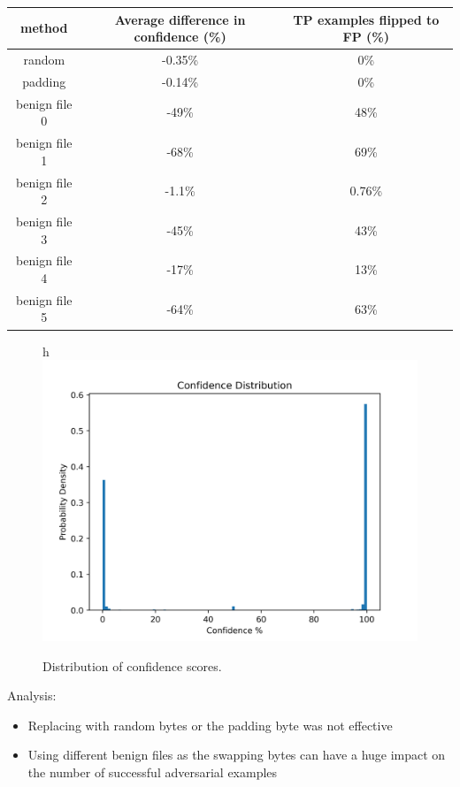 \documentclass{article}
\begin{document}
\begin{center}
	\begin{tabular}{| c | c | c |}
		\hline
		method & Average difference in confidence (\%) & TP examples flipped to FP (\%) \\
		\hline 
		random & -0.35\% & 0\% \\  
		padding & -0.14\% & 0\% \\
		benign file 0 & -49\% & 48\% \\   
		benign file 1 & -68\% & 69\% \\   
		benign file 2 & -1.1\% & 0.76\% \\ 
		benign file 3 & -45\% & 43\% \\ 
		benign file 4 & -17\% & 13\% \\
		benign file 5 & -64\% & 63\% \\
		\hline
	\end{tabular}
\end{center}

\begin{figure}{h}
	\centering
	\includegraphics[scale=.5]{./figures/confidence_distribution.png}
	\caption{Distribution of confidence scores.}
\end{figure}

Analysis:
\begin{itemize}
	\item Replacing with random bytes or the padding byte was not effective
	\item Using different benign files as the swapping bytes can have a huge impact on the number of successful adversarial examples
\end{itemize}
\end{document}
